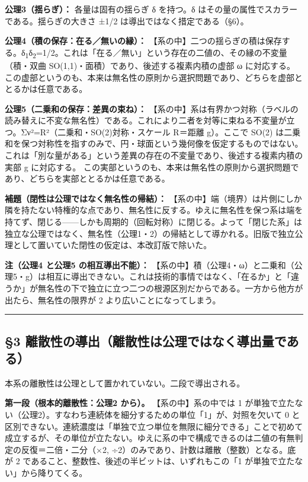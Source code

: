 \documentclass[11pt]{ltjsarticle}
\begin{document}
\textbf{公理3（揺らぎ）：} 各量は固有の揺らぎ δ を持つ。δ
はその量の属性でスカラーである。揺らぎの大きさ ±1/2
は導出ではなく措定である（§6）。

\textbf{公理4（積の保存：在る／無いの縁）：}
【系の中】二つの揺らぎの積は保存する。δ\textsubscript{1}δ\textsubscript{2}=1/2。これは「在る／無い」という存在の二値の、その縁の不変量（積・双曲
SO(1,1)・面積）であり、後述する複素内積の虚部 ω に対応する。
この虚部というのも、本来は無名性の原則から選択問題であり、どちらを虚部ととるかは任意である。

\textbf{公理5（二乗和の保存：差異の束ね）：}
【系の中】系は有界かつ対称（ラベルの読み替えに不変な無名性）である。これにより二者を対等に束ねる不変量が立つ。Σν²=R²（二乗和・SO(2)対称・スケール
R＝距離 g）。ここで SO(2)
は二乗和を保つ対称性を指すのみで、円・球面という幾何像を仮定するものではない。これは「別な量がある」という差異の存在の不変量であり、後述する複素内積の実部
g に対応する。
この実部というのも、本来は無名性の原則から選択問題であり、どちらを実部ととるかは任意である。

\textbf{補題（閉性は公理ではなく無名性の帰結）：}
【系の中】端（境界）は片側にしか隣を持たない特権的な点であり、無名性に反する。ゆえに無名性を保つ系は端を持てず、閉じる------しかも周期的（回転対称）に閉じる。よって「閉じた系」は独立な公理ではなく、無名性（公理1・2）の帰結として導かれる。旧版で独立公理として置いていた閉性の仮定は、本改訂版で除いた。

\textbf{注（公理4 と公理5 の相互導出不能）：}
【系の中】積（公理4・ω）と二乗和（公理5・g）は相互に導出できない。これは技術的事情ではなく、「在るか」と「違うか」が無名性の下で独立に立つ二つの根源区別だからである。一方から他方が出たら、無名性の限界が
2 より広いことになってしまう。

\begin{center}\rule{0.5\linewidth}{0.5pt}\end{center}

\subsection{§3
離散性の導出（離散性は公理ではなく導出量である）}\label{ux96e2ux6563ux6027ux306eux5c0eux51faux96e2ux6563ux6027ux306fux516cux7406ux3067ux306fux306aux304fux5c0eux51faux91cfux3067ux3042ux308b}

本系の離散性は公理として置かれていない。二段で導出される。

\textbf{第一段（根本的離散性：公理2 から）。} 【系の中】系の中では 1
が単独で立たない（公理2）。すなわち連続体を細分するための単位「1」が、対照を欠いて
0
と区別できない。連続濃度は「単独で立つ単位を無限に細分できる」ことで初めて成立するが、その単位が立たない。ゆえに系の中で構成できるのは二値の有無判定の反復＝二倍・二分（×2,
÷2）のみであり、計数は離散（整数）となる。底が 2
であること、整数性、後述の半ビットは、いずれもこの「1
が単独で立たない」から降りてくる。
\end{document}
